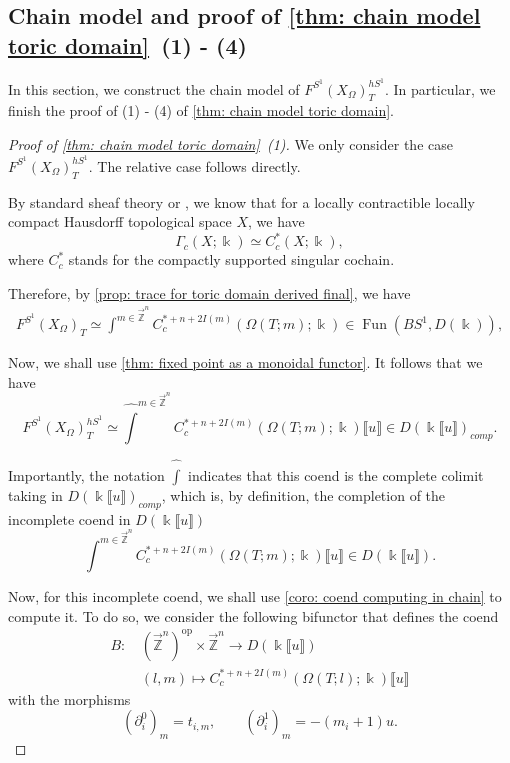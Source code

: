 \documentclass[11pt]{amsart}
\numberwithin{equation}{section}
\theoremstyle{plain}
\theoremstyle{definition}
\theoremstyle{remark}
\newcommand{\fpw}[1]{{\llbracket #1\rrbracket}}
\newcommand\Fun{\operatorname{Fun}}
\newcommand{\op}{{\operatorname{op}}}
\newcommand{\rarbZ} { \overrightarrow{\mathbb{Z}}}
\begin{document}
\subsection{Chain model and proof of \autoref{thm: chain model toric domain}~(1) - (4)}\label{section: chain model of homotopy fixed point}

In this section, we construct the chain model of $ F^{S^1}(X_\Omega)_{T}^{hS^1}$. In particular, we finish the proof of (1) - (4) of \autoref{thm: chain model toric domain}.

\begin{proof}[Proof of \autoref{thm: chain model toric domain}~(1)] We only consider the case $ F^{S^1}(X_\Omega)_{T}^{hS^1} $. The relative case follows directly.

By standard sheaf theory \cite[Chapter III.1]{BredonSheaf} or \cite[Section 3.5]{HainePortaTeyssier2023}, we know that for a locally contractible locally compact Hausdorff topological space $X$, we have
\[\Gamma_c(X;\Bbbk )\simeq C^*_c(X;\Bbbk ),\]
where $C^*_c$ stands for the compactly supported singular cochain. 

Therefore, by \autoref{prop: trace for toric domain derived final}, we have
\begin{align*}
    F^{S^1}(X_\Omega)_{T}\simeq  \int^{m\in\rarbZ^n} C^{*+n+2I(m)}_c({\Omega(T;m)} ;\Bbbk  )\in \Fun(BS^1,D(\Bbbk)),
\end{align*}

Now, we shall use \autoref{thm: fixed point as a monoidal functor}. It follows that we have
\[F^{S^1}(X_\Omega)_{T}^{hS^1}\simeq  \widehat{\int} ^{m\in\rarbZ^n} C^{*+n+2I(m)}_c({ \Omega(T;m)} ;\Bbbk  )\fpw{u}\in D(\Bbbk\fpw{u})_{comp}.\]

Importantly, the notation $\widehat{\int} $ indicates that this coend is the complete colimit taking in $D(\Bbbk\fpw{u})_{comp}$, which is, by definition, the completion of the incomplete coend in $D(\Bbbk\fpw{u})$
\begin{equation}\label{equation: underived coend in chain}
  \int^{m\in\rarbZ^n} C^{*+n+2I(m)}_c({ \Omega(T;m)} ;\Bbbk  )\fpw{u}\in D(\Bbbk\fpw{u}).  
\end{equation}


Now, for this incomplete coend, we shall use \autoref{coro: coend computing in chain} to compute it. To do so, we consider the following bifunctor that defines the coend
\begin{align*}
    B:&\,(\rarbZ^n)^\op \times \rarbZ^n\to D(\Bbbk\fpw{u})\\ &\,(l,m) \mapsto  C^{*+n+2I(m)}_c({ \Omega(T;l)} ;\Bbbk  )\fpw{u} 
\end{align*}
with the morphisms
\[(\partial_i^0)_m=t_{i,m},\qquad (\partial_i^1)_m=-(m_i+1)u.\]


\end{proof}
\end{document}
